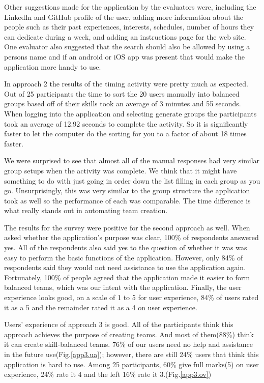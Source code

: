 \documentclass[conference]{IEEEtran}
\begin{document}
Other suggestions made for the application by the evaluators were, including the LinkedIn and GitHub profile of the user, adding more information about the people such as their past experiences, interests, schedules, number of hours they can dedicate during a week, and adding an instructions page for the web site. One evaluator also suggested that the search should also be allowed by using a persons name and if an android or iOS app was present that would make the application more handy to use.

In approach 2 the results of the timing activity were pretty much as expected. Out of 25 participants the time to sort the 20 users manually into balanced groups based off of their skills took an average of 3 minutes and 55 seconds. When logging into the application and selecting generate groups the participants took an average of 12.92 seconds to complete the activity. So it is significantly faster to let the computer do the sorting for you to a factor of about 18 times faster. 

We were surprised to see that almost all of the manual responses had very similar group setups when the activity was complete. We think that it might have something to do with just going in order down the list filling in each group as you go. Unsurprisingly, this was very similar to the group structure the application took as well so the performance of each was comparable. The time difference is what really stands out in automating team creation.

The results for the survey were positive for the second approach as well. When asked whether the application's purpose was clear, 100\% of respondents answered yes. All of the respondents also said yes to the question of whether it was was easy to perform the basic functions of the application. However, only 84\% of respondents said they would not need assistance to use the application again. Fortunately, 100\% of people agreed that the application made it easier to form balanced teams, which was our intent with the application. Finally, the user experience looks good, on a scale of 1 to 5 for user experience, 84\% of users rated it as a 5 and the remainder rated it as a 4 on user experience. 

Users' experience of approach 3 is good. All of the participants think this approach achieves the purpose of creating teams. And most of them(88\%) think it can create skill-balanced teams. 76\% of our users need no help and assistance in the future use(Fig.\ref{app3.ua}); however, there are still 24\% users that think this application is hard to use. Among 25 participants, 60\% give full marks(5) on user experience, 24\% rate it 4 and the left 16\% rate it 3.(Fig.\ref{app3.ov}) 
\end{document}
